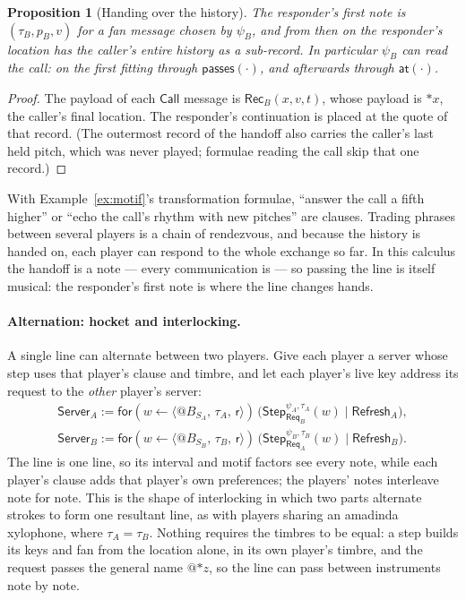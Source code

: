 \documentclass[11pt,a4paper]{article}
\makeatletter
\theoremstyle{plain}
\newtheorem{proposition}[theorem]{Proposition}
\theoremstyle{definition}
\theoremstyle{remark}
\newcommand{\nm}[3]{\langle @#1,\,#2,\,#3\rangle}
\newcommand{\rcv}[3]{\mathsf{for}(#1 \leftarrow #2)\,#3}
\newcommand{\atm}[1]{\mathsf{#1}}
\newcommand{\Rec}{\mathsf{Rec}}
\newcommand{\Call}{\mathsf{Call}}
\newcommand{\drop}{{*}}
\newcommand{\Server}{\mathsf{Server}}
\newcommand{\Refresh}{\mathsf{Refresh}}
\newcommand{\Req}{\mathsf{Req}}
\newcommand{\rest}{\mathsf{r}}
\makeatother
\begin{document}
\begin{proposition}[Handing over the history]\label{prop:handoff}
The responder's first note is $(\tau_B, p_B, v)$ for a fan message chosen by
$\psi_B$, and from then on the responder's location has the caller's entire
history as a sub-record. In particular $\psi_B$ can read the call: on the first
fitting through $\atm{passes}(\cdot)$, and afterwards through $\atm{at}(\cdot)$.
\end{proposition}
\begin{proof}
The payload of each $\Call$ message is $\Rec_B(x,v,t)$, whose payload is
$\drop x$, the caller's final location. The responder's continuation is placed
at the quote of that record. (The outermost record of the handoff also carries
the caller's last held pitch, which was never played; formulae reading the call
skip that one record.)
\end{proof}

With Example~\ref{ex:motif}'s transformation formulae, ``answer the call a fifth
higher'' or ``echo the call's rhythm with new pitches'' are clauses. Trading
phrases between several players is a chain of rendezvous, and because the
history is handed on, each player can respond to the whole exchange so far. In
this calculus the handoff is a note --- every communication is --- so passing
the line is itself musical: the responder's first note is where the line
changes hands.

\paragraph{Alternation: hocket and interlocking.} A single line can alternate
between two players. Give each player a server whose step uses that player's
clause and timbre, and let each player's live key address its request to the
\emph{other} player's server:
\begin{gather*}
\Server_A := \rcv{w}{\nm{B_{S_A}}{\tau_A}{\rest}}{\big(\mathsf{Step}^{\psi_A,\tau_A}_{\Req_B}(w) \mid \Refresh_A\big)},
\\
\Server_B := \rcv{w}{\nm{B_{S_B}}{\tau_B}{\rest}}{\big(\mathsf{Step}^{\psi_B,\tau_B}_{\Req_A}(w) \mid \Refresh_B\big)}.
\end{gather*}
The line is one line, so its interval and motif factors see every note, while
each player's clause adds that player's own preferences; the players' notes
interleave note for note. This is the shape of interlocking in which two parts
alternate strokes to form one resultant line, as with players sharing an
amadinda xylophone, where $\tau_A = \tau_B$. Nothing requires the timbres to
be equal: a step builds its keys and fan from the location alone, in its own
player's timbre, and the request passes the general name $@{\drop z}$, so the
line can pass between instruments note by note.
\end{document}
